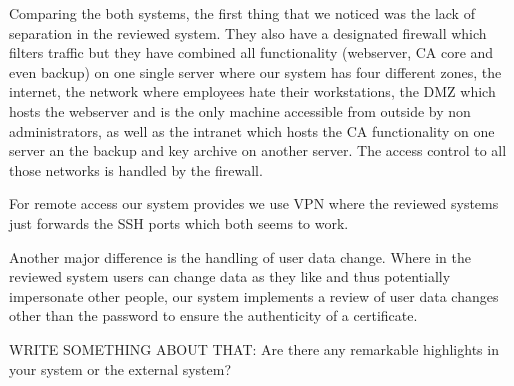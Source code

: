 \documentclass{article}
\begin{document}
Comparing the both systems, the first thing that we noticed was the lack of separation in the reviewed system. They also have a designated firewall which filters traffic but they have combined all functionality (webserver, CA core and even backup) on one single server where our system has four different zones, the internet, the network where employees hate their workstations, the DMZ which hosts the webserver and is the only machine accessible from outside by non administrators, as well as the intranet which hosts the CA functionality on one server an the backup and key archive on another server. The access control to all those networks is handled by the firewall.

For remote access our system provides we use VPN where the reviewed systems just forwards the SSH ports which both seems to work.

Another major difference is the handling of user data change. Where in the reviewed system users can change data as they like and thus potentially impersonate other people, our system implements a review of user data changes other than the password to ensure the authenticity of a certificate.

WRITE SOMETHING ABOUT THAT: Are there any remarkable highlights in your system or the external system?
\end{document}
